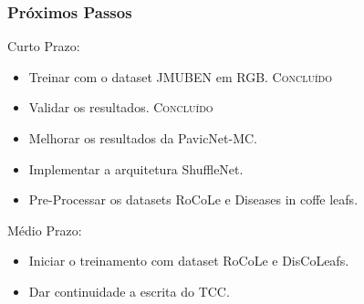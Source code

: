 \documentclass[aspectratio=169]{beamer}
\begin{document}






\begin{frame}
    \frametitle{Próximos Passos}

    \begin{block}{Curto Prazo:}

        \begin{itemize}
            \item Treinar com o dataset JMUBEN em RGB. \textsc{Concluído}
            \item Validar os resultados. \textsc{Concluído}
            \item \color{blue} Melhorar os resultados da PavicNet-MC.
            \item \color{blue} Implementar a arquitetura ShuffleNet.
            \item \color{blue} Pre-Processar os datasets RoCoLe e Diseases in coffe leafs.
        \end{itemize}

    \end{block}



    \begin{block}{Médio Prazo:}

        \begin{itemize}
            \item \color{blue} Iniciar o treinamento com dataset RoCoLe e DisCoLeafs.
            \item \color{blue} Dar continuidade a escrita do TCC.
        \end{itemize}

    \end{block}




\end{frame}





\end{document}
